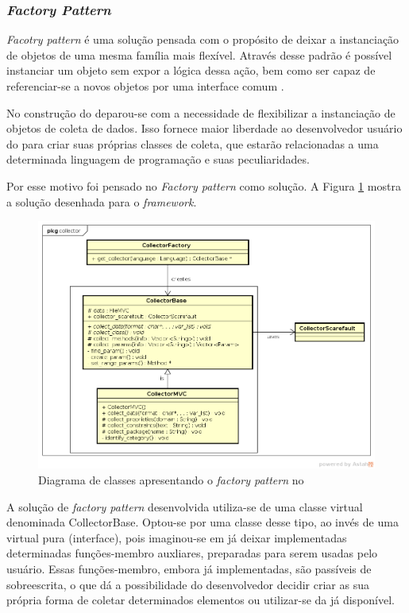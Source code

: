 \subsubsection{\textit{Factory Pattern}}
\textit{Facotry pattern} é uma solução pensada com o propósito de deixar a
instanciação de objetos de uma mesma família mais flexível. Através desse
padrão  é possível instanciar um objeto sem expor a lógica dessa ação, bem
como ser capaz de referenciar-se a novos objetos por uma interface comum
\cite{gammaEtAl1994}.

No construção do \scarefault deparou-se com a necessidade de flexibilizar
a instanciação de objetos de coleta de dados. Isso fornece maior liberdade
ao desenvolvedor usuário do \framework para criar suas próprias classes de
coleta, que estarão relacionadas a uma determinada linguagem de programação
e suas peculiaridades.

Por esse motivo foi pensado no \textit{Factory pattern} como solução. A Figura
\ref{collector-diagram} mostra a solução desenhada para o \textit{framework}.
\begin{figure}[h]
  \centering
    \includegraphics[width=\textwidth]{figuras/collector-diagram.png}
    \caption{Diagrama de classes apresentando o \textit{factory pattern} no \framework}
    \label{collector-diagram}
\end{figure}
\FloatBarrier

A solução de \textit{factory pattern} desenvolvida utiliza-se de uma classe
\textsf{virtual} denominada \textsf{CollectorBase}. Optou-se por uma classe
desse tipo, ao invés de uma \textsf{virtual} pura (\textsf{interface}), pois
imaginou-se em já deixar implementadas determinadas funções-membro auxliares,
preparadas para serem usadas pelo usuário. Essas funções-membro, embora já implementadas,
são passíveis de sobreescrita, o que dá a possibilidade do desenvolvedor
decidir criar as sua própria forma de coletar determinados elementos ou utilizar-se
da já disponível.

